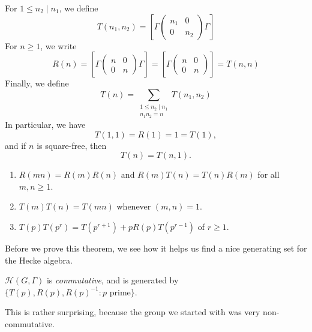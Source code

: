 \documentclass[a4paper]{article}
\begin{document}
For $1 \leq n_2 \mid n_1$, we define
\[
  T(n_1, n_2) = \left[\Gamma
    \begin{pmatrix}
      n_1 & 0 \\ 0& n_2
    \end{pmatrix} \Gamma
  \right]
\]
For $n \geq 1$, we write
\[
  R(n) = \left[\Gamma
    \begin{pmatrix}
      n & 0 \\ 0& n
    \end{pmatrix}\Gamma
  \right] =
  \left[\Gamma
    \begin{pmatrix}
      n & 0 \\ 0& n
    \end{pmatrix}
  \right] =
  T(n, n)
\]
Finally, we define
\[
  T(n) = \sum_{\substack{1 \leq n_2 \mid n_1 \\ n_1 n_2 = n}} T(n_1, n_2)
\]
In particular, we have
\[
  T(1, 1) = R(1) = 1 = T(1),
\]
and if $n$ is square-free, then
\[
  T(n) = T(n, 1).
\]
\begin{thm}\leavevmode
  \begin{enumerate}
    \item $R(mn) = R(m) R(n)$ and $R(m) T(n) = T(n) R(m)$ for all $m, n \geq 1$.
    \item $T(m)T(n) = T(mn)$ whenever $(m, n) = 1$.
    \item $T(p)T(p^r) = T(p^{r + 1}) + p R(p) T(p^{r - 1})$ of $r \geq 1$.
  \end{enumerate}
\end{thm}
Before we prove this theorem, we see how it helps us find a nice generating set for the Hecke algebra.

\begin{cor}
  $\mathcal{H}(G, \Gamma)$ is \emph{commutative}, and is generated by $\{T(p), R(p), R(p)^{-1} : p \text{ prime}\}$.
\end{cor}
This is rather surprising, because the group we started with was very non-commutative.
\end{document}

